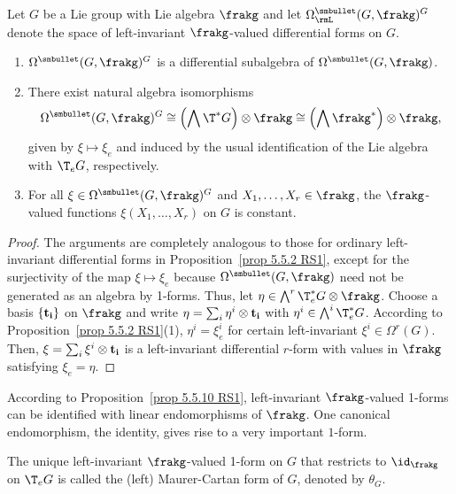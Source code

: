 \begin{prop}[{{\cite[Prop.~5.5.10]{RS1}}}]\label{prop 5.5.10 RS1}
    Let $G$ be a Lie group with Lie algebra $\frakg$ and let $\Omega^{\smbullet }_\rmL(G,\frakg)^G$ denote the space of left-invariant $\frakg$-valued differential forms on $G$.
    \begin{enumerate}
        \item $\Omega^{\smbullet }(G,\frakg)^G$ is a differential subalgebra of $\Omega^{\smbullet }(G,\frakg)$.
        \item There exist natural algebra isomorphisms
        \[\Omega^{\smbullet }(G,\frakg)^G\cong \left(\bigwedge \T^\ast G\right)\otimes\frakg\cong \left(\bigwedge\frakg^\ast\right)\otimes\frakg,\]
        given by $\xi\mapsto \xi_e$ and induced by the usual identification of the Lie algebra with $\T_eG$, respectively.
        \item For all $\xi\in\Omega^{\smbullet }(G,\frakg)^G$ and $X_1,\ldots,X_r\in\frakg$, the $\frakg$-valued functions $\xi(X_1,\ldots,X_r)$ on $G$ is constant.
    \end{enumerate}
\end{prop}
\begin{proof}
    The arguments are completely analogous to those for ordinary left-invariant differential forms in Proposition~\ref{prop 5.5.2 RS1}, except for the surjectivity of the map $\xi\mapsto \xi_e$ because $\Omega^{\smbullet }(G,\frakg)$ need not be generated as an algebra by 1-forms. Thus, let $\eta\in\bigwedge^r \T^\ast_eG\otimes \frakg$. Choose a basis $\{\bf{t}_i\}$ on $\frakg$ and write $\eta=\sum_i\eta^i\otimes \bf{t}_i$ with $\eta^i\in\bigwedge^i\T^\ast_eG$. According to Proposition~\ref{prop 5.5.2 RS1}(1), $\eta^i=\xi^i_e$ for certain left-invariant $\xi^i\in\Omega^r(G)$. Then, $\xi=\sum_i\xi^i\otimes \bf{t}_i$ is a left-invariant differential $r$-form with values in $\frakg$ satisfying $\xi_e=\eta$.
\end{proof}

According to Proposition~\ref{prop 5.5.10 RS1}, left-invariant $\frakg$-valued 1-forms can be identified with linear endomorphisms of $\frakg$. One canonical endomorphism, the identity, gives rise to a very important $1$-form.

\begin{defn}
    The unique left-invariant $\frakg$-valued 1-form on $G$ that restricts to $\id_\frakg$ on $\T_e G$ is called the (left) Maurer-Cartan form of $G$, denoted by $\theta_G$.
\end{defn}

